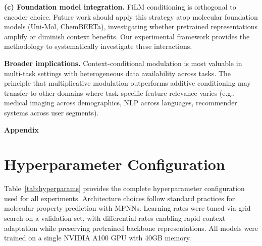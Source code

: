 \documentclass{article}
\begin{document}
\textbf{(c) Foundation model integration.} FiLM conditioning is orthogonal to encoder choice. Future work should apply this strategy atop molecular foundation models (Uni-Mol, ChemBERTa), investigating whether pretrained representations amplify or diminish context benefits. Our experimental framework provides the methodology to systematically investigate these interactions.

\textbf{Broader implications.} Context-conditional modulation is most valuable in multi-task settings with heterogeneous data availability across tasks. The principle that multiplicative modulation outperforms additive conditioning may transfer to other domains where task-specific feature relevance varies (e.g., medical imaging across demographics, NLP across languages, recommender systems across user segments).


\newpage
\begin{center}
\Large\textbf{Appendix}
\end{center}
\vspace{1em}

\appendix

\section{Hyperparameter Configuration}
\label{app:hyperparams}

Table~\ref{tab:hyperparams} provides the complete hyperparameter configuration used for all experiments. Architecture choices follow standard practices for molecular property prediction with MPNNs. Learning rates were tuned via grid search on a validation set, with differential rates enabling rapid context adaptation while preserving pretrained backbone representations. All models were trained on a single NVIDIA A100 GPU with 40GB memory.
\end{document}

